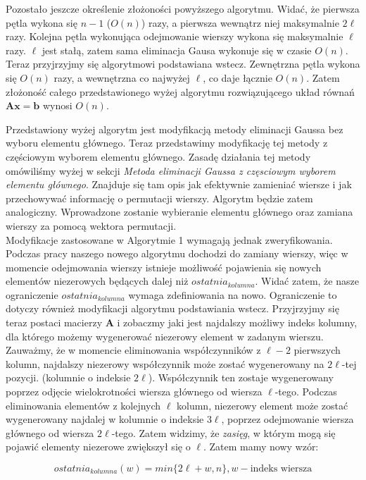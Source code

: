 \documentclass[]{article}
\newcommand{\mA}{\bm{A}}
\newcommand{\vb}{\bm{b}}
\newcommand{\vx}{\bm{x}}
\begin{document}
	Pozostało jeszcze określenie złożoności powyższego algorytmu. Widać, że pierwsza pętla wykona się $n-1$ ($O(n)$) razy, a pierwsza wewnątrz niej maksymalnie $2\ell$ razy. Kolejna pętla wykonująca odejmowanie wierszy wykona się maksymalnie $\ell$ razy. $\ell$ jest stałą, zatem sama eliminacja Gausa wykonuje się w czasie $O(n)$. Teraz przyjrzyjmy się algorytmowi podstawiana wstecz. Zewnętrzna pętla wykona się $O(n)$ razy, a wewnętrzna co najwyżej $\ell$, co daje łącznie $O(n)$. Zatem złożoność całego przedstawionego wyżej algorytmu rozwiązującego układ równań $\mA\vx=\vb$ wynosi $O(n)$.
	
	Przedstawiony wyżej algorytm jest modyfikacją metody eliminacji Gaussa bez wyboru elementu głównego. Teraz przedstawimy modyfikację tej metody z częściowym wyborem elementu głównego. Zasadę działania tej metody omówiliśmy wyżej w sekcji \textit{Metoda eliminacji Gaussa z częsciowym wyborem elementu głównego}. Znajduje się tam opis jak efektywnie zamieniać wiersze i jak przechowywać informację o permutacji wierszy. Algorytm będzie zatem analogiczny. Wprowadzone zostanie wybieranie elementu głównego oraz zamiana wierszy za pomocą wektora permutacji. \\
	Modyfikacje zastosowane w Algorytmie 1 wymagają jednak zweryfikowania. Podczas pracy naszego nowego algorytmu dochodzi do zamiany wierszy, więc w momencie odejmowania wierszy istnieje możliwość pojawienia się nowych elementów niezerowych będących dalej niż $ostatnia_{kolumna}$. Widać zatem, że nasze ograniczenie $ostatnia_{kolumna}$ wymaga zdefiniowania na nowo. Ograniczenie to dotyczy również modyfikacji algorytmu podstawiania wstecz. Przyjrzyjmy się teraz postaci macierzy $\mA$ i zobaczmy jaki jest najdalszy możliwy indeks kolumny, dla którego możemy wygenerować niezerowy element w zadanym wierszu. Zauważmy, że w momencie eliminowania współczynników z $\ell -2$ pierwszych kolumn, najdalszy niezerowy współczynnik może zostać wygenerowany na $2\ell$-tej pozycji. (kolumnie o indeksie  $2\ell$).
	Współczynnik ten zostaje wygenerowany poprzez odjęcie wielokrotności wiersza głównego od wiersza $\ell$-tego. Podczas eliminowania elementów z kolejnych $\ell$ kolumn, niezerowy element może zostać wygenerowany najdalej w kolumnie o indeksie $3\ell$, poprzez odejmowanie wiersza głównego od wiersza $2\ell$-tego. Zatem widzimy, że \textit{zasięg}, w którym mogą się pojawić elementy niezerowe zwiększył się o $\ell$. Zatem mamy nowy wzór:
	
	$$ ostatnia_{kolumna}(w) = min\lbrace 2\ell + w , n \rbrace, w - \text{indeks wiersza} $$
	
\end{document}

